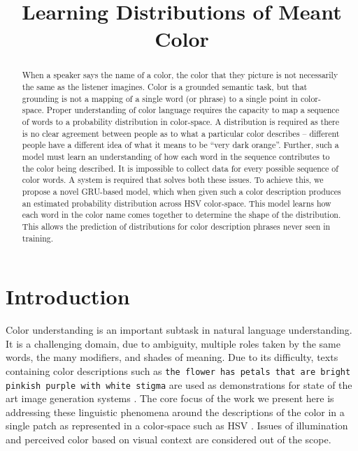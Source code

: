 \documentclass[11pt,a4paper]{article}
\title{Learning Distributions of Meant Color}
\newcommand{\parencite}{\citep}
\begin{document}
\maketitle

\begin{abstract}
When a speaker says the name of a color, the color that they picture is not necessarily the same as the listener imagines.
Color is a grounded semantic task, but that grounding is not a mapping of a single word (or phrase) to a single point in color-space.
Proper understanding of color language requires the capacity to map a sequence of words to a probability distribution in color-space.
A distribution is required as there is no clear agreement between people as to what a particular color describes -- different people have a different idea of what it means to be ``very dark orange''.
Further, such a model must learn an understanding of how each word in the sequence contributes to the color being described.
It is impossible to collect data for every possible sequence of color words.
A system is required that solves both these issues.
To achieve this, we propose a novel GRU-based model, which when given such a color description produces an estimated probability distribution across HSV color-space.
This model learns how each word in the color name comes together to determine the shape of the distribution.
This allows the prediction of distributions for color description phrases never seen in training.
\end{abstract}

\section{Introduction}\label{sec:intro}

Color understanding is an important subtask in natural language understanding.
It is a challenging domain, due to ambiguity, multiple roles taken by the same words, the many modifiers, and shades of meaning.
Due to its difficulty, texts containing color descriptions such as \texttt{the flower has petals that are bright pinkish purple with white stigma} are used as demonstrations for state of the art image generation systems \parencite{reed2016generative, 2015arXiv151102793M}.
The core focus of the work we present here is addressing these linguistic phenomena around the descriptions of the color in a single patch as represented in a color-space such as HSV \parencite{smith1978color}.
Issues of illumination and perceived color based on visual context are considered out of the scope.
\end{document}
